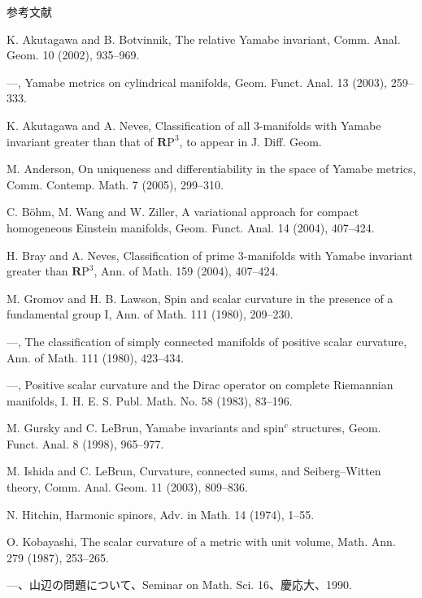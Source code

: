 \documentclass[uplatex,dvipdfmx]{jlreq}
\begin{document}
\newpage

\begin{center}\textsc{参考文献}\end{center}

\begin{enumerate}[{[1]}]
  \item K. Akutagawa and B. Botvinnik, The relative Yamabe invariant,
    Comm. Anal. Geom. 10 (2002), 935--969.
  \item ---, Yamabe metrics on cylindrical manifolds, Geom.
    Funct. Anal. 13 (2003), 259--333.
  \item K. Akutagawa and A. Neves, Classification of all
    3-manifolds with Yamabe invariant greater than that of $\mathbf{R}\mathrm{P}^3$,
    to appear in J. Diff. Geom.
  \item M. Anderson, On uniqueness and differentiability in
    the space of Yamabe metrics, Comm. Contemp. Math. 7 (2005), 299--310.
  \item C. B\"ohm, M. Wang and W. Ziller, A variational approach for compact
    homogeneous Einstein manifolds, Geom. Funct. Anal. 14 (2004), 407--424.
  \item H. Bray and A. Neves, Classification of prime
    3-manifolds with Yamabe invariant greater than $\mathbf{R}\mathrm{P}^3$,
    Ann. of Math. 159 (2004), 407--424.
  \item M. Gromov and H. B. Lawson, Spin and scalar curvature in the presence
    of a fundamental group I, Ann. of Math. 111 (1980), 209--230.
  \item ---, The classification of simply connected manifolds of positive
    scalar curvature, Ann. of Math. 111 (1980), 423--434.
  \item ---, Positive scalar curvature and the Dirac operator on complete
    Riemannian manifolds, I. H. E. S. Publ. Math. No. 58 (1983), 83--196.
  \item M. Gursky and C. LeBrun, Yamabe invariants and spin${}^c$ structures,
    Geom. Funct. Anal. 8 (1998), 965--977.
  \item M. Ishida and C. LeBrun, Curvature, connected sums, and Seiberg--Witten
    theory, Comm. Anal. Geom. 11 (2003), 809--836.
  \item N. Hitchin, Harmonic spinors, Adv. in Math. 14 (1974), 1--55.
  \item O. Kobayashi, The scalar curvature of a metric with unit volume,
    Math. Ann. 279 (1987), 253--265.
  \item ---、山辺の問題について、Seminar on Math. Sci. 16、慶応大、1990.

\end{enumerate}
\end{document}
